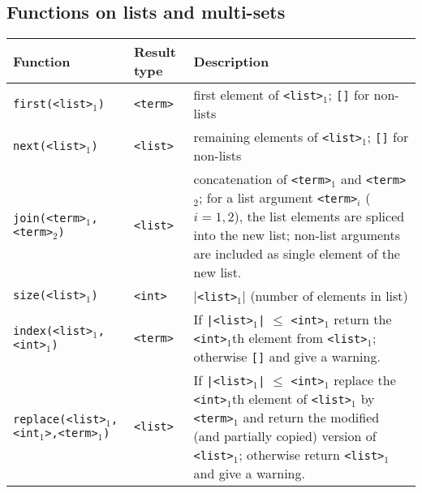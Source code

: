 \documentclass[twoside]{article} %
\begin{document}
\newpage

\subsection{Functions on lists and multi-sets}

\begin{tabular}{|l|l|p{8cm}|} \hline
 Function                       & Result type   & Description \\ \hline
 {\tt first(<list>$_1$)}                & {\tt  <term>}  & first element of {\tt <list>$_1$}; {\tt []} for non-lists\\
 {\tt next(<list>$_1$)}                 & {\tt  <list>}  & remaining elements of {\tt <list>$_1$}; {\tt []} for non-lists \\
 {\tt join(<term>$_1$,<term>$_2$)}      & {\tt  <list>}  & concatenation of {\tt <term>$_1$} and {\tt <term>$_2$};
                                                           for a list argument {\tt <term>$_i$} ($i=1,2$),
                                                           the list elements are spliced into the new list;
                                                           non-list arguments are included as single element of the
                                                           new list. \\
 {\tt size(<list>$_1$)}                 & {\tt  <int>}   & {\tt $|$<list>$_1|$} (number of elements in list)\\ \hline

 {\tt index(<list>$_1$,<int>$_1$)}      & {\tt <term>}   & If {\tt |<list>$_1$|} $\leq$ {\tt <int>$_1$} return the
                                                           {\tt <int>$_1$}th element from {\tt <list>$_1$};
                                                           otherwise {\tt []} and give a warning.\\
 {\tt replace(<list>$_1$,<int$_1$>,<term>$_1$)} & {\tt <list>}   &  If {\tt |<list>$_1$|} $\leq$ {\tt <int>$_1$} replace the
                                                           {\tt <int>$_1$}th element of {\tt <list>$_1$} by 
                                                           {\tt <term>$_1$} and return the modified (and partially
                                                           copied) version of {\tt <list>$_1$};
                                                           otherwise return {\tt <list>$_1$} and give a warning.\\  \hline


\end{tabular}
\end{document}
